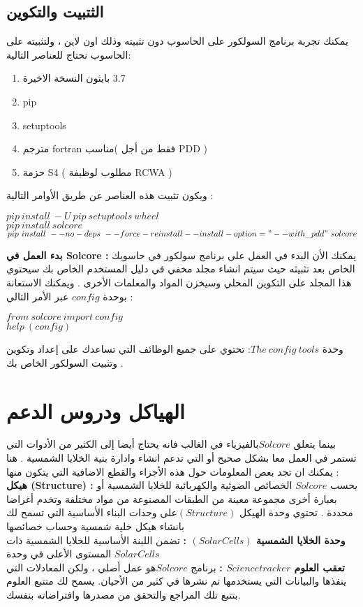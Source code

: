 \subsection{ الثتبيت والتكوين }
يمكنك تجربة برنامج السولكور على الحاسوب دون تثبيته وذلك اون لاين ، ولتثبيته  على الحاسوب نحتاج للعناصر التالية:
\begin{enumerate}
	\item بايثون النسخة الاخيرة $ 3.7 $
	\item pip 
	\item setuptools 
	\item  مترجم fortran مناسب( فقط من أجل PDD ) 
	\item حزمة S4 ( مطلوب لوظيفة RCWA )
\end{enumerate}
ويكون تثبيت هذه العناصر عن طريق الأوامر التالية :\\    
\begin{flushleft}
	$ pip ~ install ~-U ~pip~ setuptools~ wheel $\\
	$ pip~ install ~solcore $
	$ pip ~install ~--no-deps~ --force-reinstall --install-option="--with\_pdd"~ solcore $
	
\end{flushleft}
\textbf{بدء العمل في  Solcore :} 
يمكنك الأن البدء في العمل على برنامج سولكور في حاسوبك الخاص بعد تثبيثه حيث سيتم انشاء مجلد مخفي في دليل المستخدم الخاص بك سيحتوي هذا المجلد على التكوين المحلي وسيخزن المواد والمعلمات الأخرى . ويمكنك الاستعانة بوحدة $ config $ عبر الأمر التالي :\begin{flushleft}
	$ 
	from ~solcore ~import~ config $
	\\
	$ help~(config)
	$
\end{flushleft}
وحدة $ The~ config~ tools  $: تحتوي على جميع الوظائف التي تساعدك على إعداد وتكوين وتثبيت السولكور الخاص بك .  
\section{ الهياكل ودروس الدعم}
بينما يتعلق $ Solcore $بالفيزياء في الغالب فانه يحتاج أيضا إلى الكثير من الأدوات التي تستمر في العمل معا بشكل صحيح أو التي تدعم انشاء وادارة بنية الخلايا الشمسية . هنا يمكنك ان تجد بعص المعلومات حول هذه الأجزاء والقطع الاضافية التي يتكون منها : \\
\textbf{هيكل (Structure) :}
يحسب $ Solcore $ الخصائص الضوئية والكهربائية للخلايا الشمسية أو بعبارة أخرى مجموعة معينة من الطبقات المصنوعة من مواد مختلفة وتخدم أغراضا محددة . تحتوي وحدة الهيكل $ (Structure)  $على وحدات البناء الأساسية التي تسمح لك بانشاء هيكل خلية شمسية وحساب خصائصها \\
\textbf{وحدة الخلايا الشمسية $ (Solar Cells) $ :}
تضمن اللبنة الأساسية للخلايا الشمسية ذات المستوى الأعلى في وحدة $ Solar Cells $ \\
\textbf{تعقب العلوم  $ Science tracker $ :} 
برنامج $ Solcore  $هو عمل أصلي ، ولكن المعادلات التي ينفذها والبيانات التي يستخدمها تم نشرها في كثير من الأحيان. يسمح لك متتبع العلوم بتتبع تلك المراجع والتحقق من مصدرها وافتراضاته بنفسك. 
